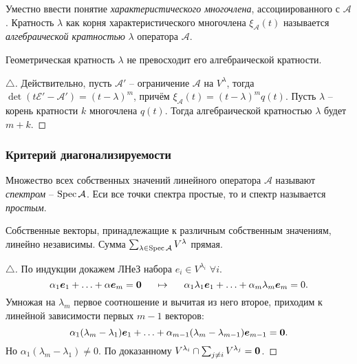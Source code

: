 Уместно ввести понятие \textit{характеристического многочлена}, ассоциированного с 
$\mathcal A $.  Кратность $\lambda $ как корня характеристического многочлена $\xi_{\mathcal A} (t)$ называется \textit{алгебраической кратностью} $\lambda $ оператора $\mathcal A $.

\begin{to_thr} 
     Геометрическая кратность $\lambda $ не превосходит его алгебраической кратности.
\end{to_thr}
 
\begin{proof}[$\triangle$]
Действительно, пусть $\mathcal A' $ -- ограничение $\mathcal A $ на $V^{\lambda} $, тогда $\det (t \mathcal E' - \mathcal A') = (t - \lambda)^m $, причём $\xi_{\mathcal A} (t) = (t-\lambda)^m q(t)$. Пусть $\lambda $ -- корень кратности $k $ многочлена $q(t) $. Тогда алгебраической кратностью $\lambda $ будет $m+k $.
\end{proof}


\subsubsection{Критерий диагонализируемости}

\begin{to_def} 
    Множество всех собственных значений линейного оператора $\mathcal A $ называют \textit{спектром} -- $\mathop{\mathrm{Spec}}\nolimits \mathcal A $. Еси все точки спектра простые, то и спектр называется \textit{простым}.
\end{to_def}

\begin{to_lem} 
\label{lem_1}
    Собственные векторы, принадлежащие к различным собственным значениям, линейно независимы. Сумма $\sum_{\lambda \in \mathop{\mathrm{Spec}}\nolimits \mathcal A} V^{\lambda}$ прямая. 
\end{to_lem}

\begin{proof}[$\triangle$]
    По индукции докажем ЛНеЗ набора $e_i \in V^{\lambda_i}$ $\forall i $. 
$$
    \alpha_1 \mbox{\boldmath $e$}_1 + \ldots + \alpha \mbox{\boldmath $e$}_m = \mbox{\boldmath $0$} \hspace{0.5cm} \mapsto \hspace{0.5cm} \alpha_1 \lambda_1 \mbox{\boldmath $e$}_1 + \ldots + \alpha_m \lambda_m \mbox{\boldmath $e$}_m = 0.
$$
Умножая на $\lambda_m $ первое соотношение и вычитая из него второе, приходим к линейной зависимости первых $m-1 $ векторов:
$$
    \alpha_1 (\lambda_m - \lambda_1) \mbox{\boldmath $e$}_1 + \ldots 
    + \alpha_{m-1} (\lambda_m - \lambda_{m-1}) \mbox{\boldmath $e$}_{m-1} = \mbox{\boldmath $0$}.
$$
Но $\alpha_1 (\lambda_m - \lambda_1) \neq 0$. По доказанному $V^{\lambda_i} \cap \sum_{j \neq i} V^{\lambda_j} = \mbox{\boldmath $0$} $.
\end{proof}

